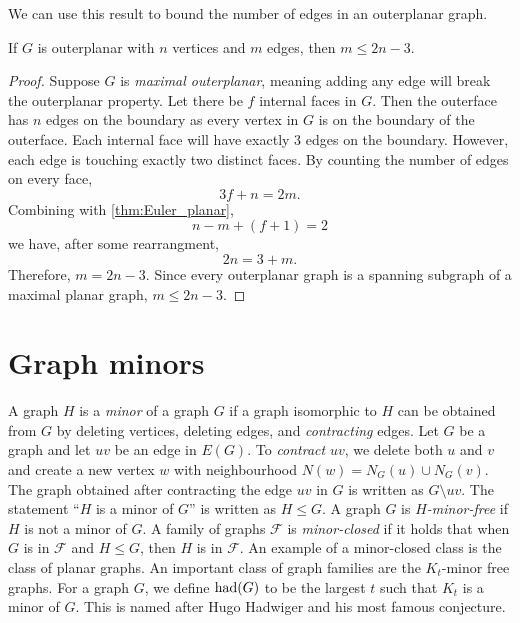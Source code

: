 We can use this result to bound the number of edges in an outerplanar graph.
\begin{theorem}\label{thm:outerplanar_bound}
	If \(G\) is outerplanar with \(n\) vertices and \(m\) edges, then \(m \leq 2n - 3\).
\end{theorem}

\begin{proof}
	Suppose \(G\) is \textit{maximal outerplanar}, meaning adding any edge will break the outerplanar property. Let there be \(f\) internal faces in $G$. Then the outerface has \(n\) edges on the boundary as every vertex in $G$ is on the boundary of the outerface. Each internal face will have exactly \(3\) edges on the boundary. However, each edge is touching exactly two distinct faces. By counting the number of edges on every face,
	\begin{equation*}
		3 f + n = 2m.
	\end{equation*}
	Combining with \cref{thm:Euler_planar},
	\begin{equation*}
		n - m + (f + 1) = 2
	\end{equation*}
	we have, after some rearrangment,
	\begin{equation*}
		2n = 3 + m.
	\end{equation*}
	Therefore, \(m = 2n - 3\). Since every outerplanar graph is a spanning subgraph of a maximal planar graph, \(m \leq 2n - 3\).
\end{proof}
\section{Graph minors}\label{sec:Graph Minors}
A graph \(H\) is a \textit{minor} of a graph \(G\) if a graph isomorphic to \(H\) can be obtained from \(G\) by deleting vertices, deleting edges, and \textit{contracting} edges. Let $G$ be a graph and let $uv$ be an edge in $E(G)$. To \textit{contract} \(uv\), we delete both \(u\) and \(v\) and create a new vertex \(w\) with neighbourhood \(N(w) = N_G(u) \cup N_G(v)\). The graph obtained after contracting the edge \(uv\) in $G$ is written as \(G\setminus uv\).
The statement ``\(H\) is a minor of \(G\)'' is written as \(H \leq G\). A graph \(G\) is \textit{\(H\)-minor-free} if $H$ is not a minor of $G$. A family of graphs \(\mathcal{F}\) is \textit{minor-closed} if it holds that when $G$ is in \(\mathcal{F}\) and \(H \leq G\), then $H$ is in \(\mathcal{F}\).
An example of a minor-closed class is the class of planar graphs.
An important class of graph families are the \(K_t\)-minor free graphs. For a graph \(G\), we define \(\operatorname{had}(G)\) to be the largest \(t\) such that \(K_t\) is a minor of \(G\). This is named after Hugo Hadwiger and his most famous conjecture.

